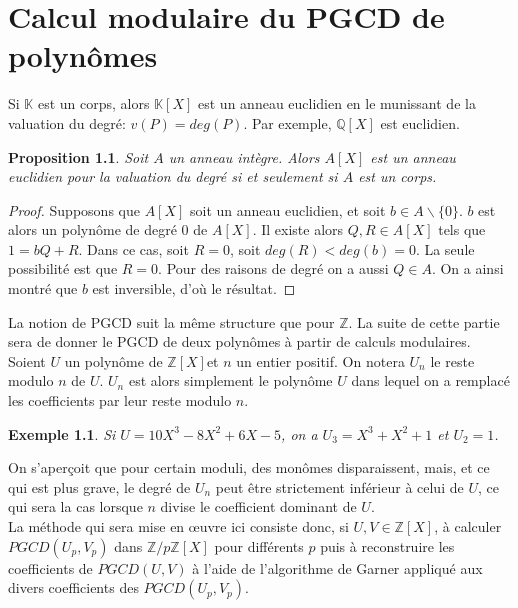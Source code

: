 \documentclass[12pt]{report}
\newtheorem*{rap}{Rappels}
\newtheorem*{ex}{Exemple}
\newtheorem{Prop}[thm]{Proposition}
\begin{document}
\chapter{Calcul modulaire du PGCD de polynômes}


Si $\mathbb{K}$ est un corps, alors $\mathbb{K}[X]$ est un anneau euclidien en le munissant de la valuation du degré: $v(P)=deg(P)$. Par exemple, $\mathbb{Q}[X]$ est euclidien.

\begin{Prop}
Soit $A$ un anneau intègre. Alors $A[X]$ est un anneau euclidien pour la valuation du degré si et seulement si $A$ est un corps.
\end{Prop}

\begin{proof}
Supposons que $A[X]$ soit un anneau euclidien, et soit $b \in A \smallsetminus \{  0 \}$. $b$ est alors un polynôme de degré 0 de $A [X]$. Il existe alors $Q,R \in A[X]$ tels que $1=bQ+R$. Dans ce cas, soit $R=0$, soit $deg(R)<deg(b)=0$. La seule possibilité est que $R=0$. Pour des raisons de degré on a aussi $Q\in A$. On a ainsi montré que $b$ est inversible, d'où le résultat.
\end{proof}


La notion de PGCD suit la même structure que pour $\mathbb{Z}$. La suite de cette partie sera de donner le PGCD de deux polynômes à partir de calculs modulaires.\\

Soient $U$ un polynôme de $\mathbb{Z}[X]$et $n$ un entier positif. On notera $U_n$ le reste modulo $n$ de $U$. $U_n$ est alors simplement le polynôme $U$ dans lequel on a remplacé les coefficients par leur reste modulo $n$.

\begin{ex}
Si $U=10X^3-8X^2+6X-5$, on a $U_3= X^3+ X^2 +1$ et $U_2=1$.
\end{ex}

On s'aperçoit que pour certain moduli, des monômes disparaissent, mais, et ce qui est plus grave, le degré de $U_n$ peut être strictement inférieur à celui de $U$, ce qui sera la cas lorsque $n$ divise le coefficient dominant de $U$.\\

La méthode qui sera mise en œuvre ici consiste donc, si $U,V\in \mathbb{Z}[X] $, à calculer $PGCD(U_p,V_p)$ dans $\mathbb{Z}/p\mathbb{Z}[X]$ pour différents $p$ puis à reconstruire les coefficients de $PGCD(U,V)$ à l'aide de l'algorithme de Garner appliqué aux divers coefficients des $PGCD(U_p,V_p)$. \\
\end{document}
